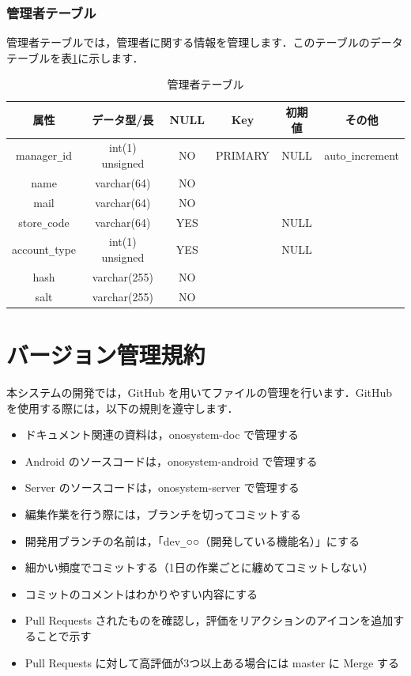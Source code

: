\documentclass[a4j,titlepage]{jarticle}
\begin{document}
\subsubsection{管理者テーブル}
管理者テーブルでは，管理者に関する情報を管理します．このテーブルのデータテーブルを表\ref{manager}に示します．
\begin{table}[htb]
  \caption{管理者テーブル}
  \label{manager}
  \begin{center}
    \begin{tabular}{|c|c|c|c|c|c|} \hline
      属性 & データ型/長 & NULL & Key & 初期値 & その他 \\ \hline \hline
      manager\verb|_|id & int(1) unsigned & NO & PRIMARY & NULL & auto\verb|_|increment\\ \hline
      name & varchar(64) & NO &   &  & \\ \hline
      mail & varchar(64) & NO &  &  & \\ \hline
      store\verb|_|code & varchar(64) & YES &   & NULL & \\ \hline
      account\verb|_|type & int(1) unsigned & YES &   & NULL & \\ \hline
      hash & varchar(255) & NO &   &  & \\ \hline
      salt & varchar(255) & NO &   &  & \\ \hline
    \end{tabular}
  \end{center}
\end{table}


\section{バージョン管理規約}
本システムの開発では，GitHub を用いてファイルの管理を行います．GitHub を使用する際には，以下の規則を遵守します．
\begin{itemize}
\item ドキュメント関連の資料は，onosystem-doc で管理する
\item Android のソースコードは，onosystem-android で管理する
\item Server のソースコードは，onosystem-server で管理する
\item 編集作業を行う際には，ブランチを切ってコミットする
\item 開発用ブランチの名前は，「dev\verb|_|○○（開発している機能名）」にする
\item 細かい頻度でコミットする（1日の作業ごとに纏めてコミットしない）
\item コミットのコメントはわかりやすい内容にする
\item Pull Requests されたものを確認し，評価をリアクションのアイコンを追加することで示す
\item Pull Requests に対して高評価が3つ以上ある場合には master に Merge する
\end{itemize}
\end{document}
